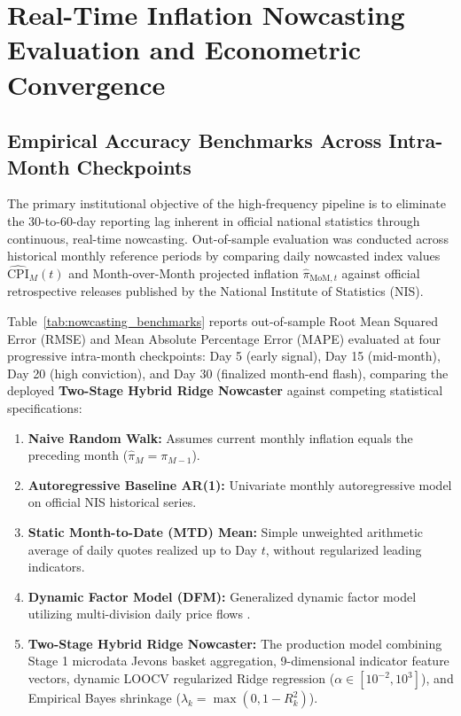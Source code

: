 \section{Real-Time Inflation Nowcasting Evaluation and Econometric Convergence}

\subsection{Empirical Accuracy Benchmarks Across Intra-Month Checkpoints}
\hs The primary institutional objective of the high-frequency pipeline is to eliminate the 30-to-60-day reporting lag inherent in official national statistics through continuous, real-time nowcasting. Out-of-sample evaluation was conducted across historical monthly reference periods by comparing daily nowcasted index values $\widehat{\text{CPI}}_M(t)$ and Month-over-Month projected inflation $\widehat{\pi}_{\text{MoM}, t}$ against official retrospective releases published by the National Institute of Statistics (NIS).

\hs Table~\ref{tab:nowcasting_benchmarks} reports out-of-sample Root Mean Squared Error (RMSE) and Mean Absolute Percentage Error (MAPE) evaluated at four progressive intra-month checkpoints: Day 5 (early signal), Day 15 (mid-month), Day 20 (high conviction), and Day 30 (finalized month-end flash), comparing the deployed \textbf{Two-Stage Hybrid Ridge Nowcaster} against competing statistical specifications:
\begin{enumerate}
    \item \textbf{Naive Random Walk:} Assumes current monthly inflation equals the preceding month ($\widehat{\pi}_M = \pi_{M-1}$).
    \item \textbf{Autoregressive Baseline AR(1):} Univariate monthly autoregressive model on official NIS historical series.
    \item \textbf{Static Month-to-Date (MTD) Mean:} Simple unweighted arithmetic average of daily quotes realized up to Day $t$, without regularized leading indicators.
    \item \textbf{Dynamic Factor Model (DFM):} Generalized dynamic factor model utilizing multi-division daily price flows \citep{babii2022machine}.
    \item \textbf{Two-Stage Hybrid Ridge Nowcaster:} The production model combining Stage 1 microdata Jevons basket aggregation, 9-dimensional indicator feature vectors, dynamic LOOCV regularized Ridge regression ($\alpha \in [10^{-2}, 10^3]$), and Empirical Bayes shrinkage ($\lambda_k = \max(0, 1 - R_k^2)$).
\end{enumerate}

